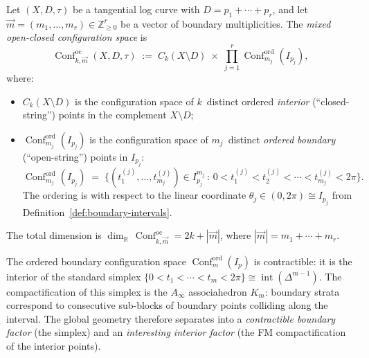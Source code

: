 \begin{definition}
\label{def:mixed-config-space}
Let $(X, D, \tau)$ be a tangential log curve with $D = p_1 +
\cdots + p_r$, and let $\vec{m} = (m_1, \ldots, m_r) \in
\mathbb{Z}_{\geq 0}^r$ be a vector of boundary multiplicities.
The \emph{mixed open-closed configuration space} is
\begin{equation}\label{eq:mixed-config-space}
\operatorname{Conf}^{\mathrm{oc}}_{k, \vec{m}}(X, D, \tau)
\;:=\;
C_k(X \setminus D)
\;\times\;
\prod_{j=1}^{r}
\operatorname{Conf}^{\mathrm{ord}}_{m_j}(I_{p_j}),
\end{equation}
where:
\begin{itemize}
\item $C_k(X \setminus D)$ is the configuration space of
 $k$~distinct ordered \emph{interior} (``closed-string'') points
 in the complement $X \setminus D$;
\item $\operatorname{Conf}^{\mathrm{ord}}_{m_j}(I_{p_j})$ is the
 configuration space of $m_j$~distinct \emph{ordered}
 \emph{boundary} (``open-string'') points in $I_{p_j}$:
 \begin{equation}\label{eq:ordered-boundary-config}
 \operatorname{Conf}^{\mathrm{ord}}_{m_j}(I_{p_j})
 \;=\;
 \bigl\{(t_1^{(j)}, \ldots, t_{m_j}^{(j)}) \in
 I_{p_j}^{m_j}
 \,:\,
 0 < t_1^{(j)} < t_2^{(j)} < \cdots < t_{m_j}^{(j)} < 2\pi
 \bigr\}.
 \end{equation}
 The ordering is with respect to the linear coordinate
 $\theta_j \in (0, 2\pi) \cong I_{p_j}$ from
 Definition~\ref{def:boundary-intervals}.
\end{itemize}
The total dimension is
$\dim_{\mathbb{R}}\,
\operatorname{Conf}^{\mathrm{oc}}_{k,\vec{m}}
= 2k + |\vec{m}|$,
where $|\vec{m}| = m_1 + \cdots + m_r$.
\end{definition}

\begin{remark}
\label{rem:boundary-ordering-associahedron}
The ordered boundary configuration space
$\operatorname{Conf}^{\mathrm{ord}}_{m}(I_p)$ is contractible:
it is the interior of the standard simplex
$\{0 < t_1 < \cdots < t_m < 2\pi\} \cong
\operatorname{int}(\Delta^{m-1})$. The compactification of this
simplex is the $A_\infty$ associahedron $K_m$: boundary strata
correspond to consecutive sub-blocks of boundary points colliding
along the interval. The global geometry therefore separates into a
\emph{contractible boundary factor} (the simplex) and an
\emph{interesting interior factor} (the FM compactification of the
interior points).
\end{remark}

